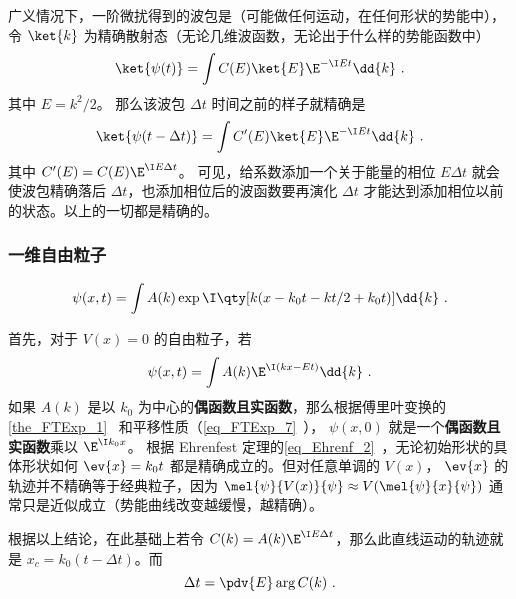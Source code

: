 
\begin{issues}
\issueDraft
\end{issues}

广义情况下，一阶微扰得到的波包是（可能做任何运动，在任何形状的势能中）， 令 $\ket{k}$ 为精确散射态（无论几维波函数，无论出于什么样的势能函数中）
\begin{equation}
\ket{\psi(t)} = \int C(E)\ket{E}\E^{-\I Et}\dd{k}~.
\end{equation}
其中 $E = k^2/2$。 那么该波包 $\Delta t$ 时间之前的样子就精确是
\begin{equation}
\ket{\psi(t-\Delta t)} = \int C'(E)\ket{E}\E^{-\I Et}\dd{k}~.
\end{equation}
其中 $C'(E) = C(E)\E^{\I E \Delta t}$。 可见，给系数添加一个关于能量的相位 $E \Delta t$ 就会使波包精确落后 $\Delta t$，也添加相位后的波函数要再演化 $\Delta t$ 才能达到添加相位以前的状态。以上的一切都是精确的。

\subsubsection{一维自由粒子}
\begin{equation}
\psi(x,t) = \int A(k)\exp\I\qty[k(x-k_0t - kt/2 + k_0t)] \dd{k}~.
\end{equation}

首先，对于 $V(x)=0$ 的自由粒子，若
\begin{equation}
\psi(x,t) = \int A(k)\E^{\I (kx-Et)} \dd{k}~.
\end{equation}
如果 $A(k)$ 是以 $k_0$ 为中心的\textbf{偶函数且实函数}，那么根据傅里叶变换的\autoref{the_FTExp_1}~ 和平移性质（\autoref{eq_FTExp_7}~）， $\psi(x,0)$ 就是一个\textbf{偶函数且实函数}乘以 $\E^{\I k_0 x}$。 根据 Ehrenfest 定理的\autoref{eq_Ehrenf_2}~，无论初始形状的具体形状如何 $\ev{x} = k_0 t$ 都是精确成立的。但对任意单调的 $V(x)$， $\ev{x}$ 的轨迹并不精确等于经典粒子，因为 $\mel{\psi}{V(x)}{\psi} \approx V(\mel{\psi}{x}{\psi})$ 通常只是近似成立（势能曲线改变越缓慢，越精确）。


根据以上结论，在此基础上若令 $C(k) = A(k)\E^{\I E\Delta t}$，那么此直线运动的轨迹就是 $x_c = k_0(t-\Delta t)$。而
\begin{equation}
\Delta t = \pdv{E} \arg C(k)~.
\end{equation}

